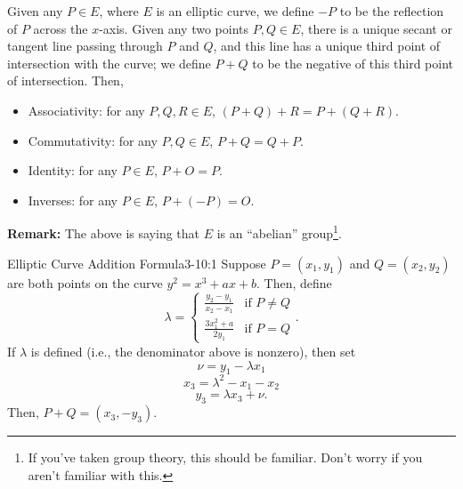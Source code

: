 \documentclass[letterpaper]{article}
\begin{document}
\begin{itemize}
    \begin{theorem}{}{}
        Given any $P \in E$, where $E$ is an elliptic curve, we define $-P$ to be the reflection of $P$ across the $x$-axis. Given any two points $P, Q \in E$, there is a unique secant or tangent line passing through $P$ and $Q$, and this line has a unique third point of intersection with the curve; we define $P + Q$ to be the negative of this third point of intersection. Then, 
        \begin{itemize}
            \item Associativity: for any $P, Q, R \in E$, $(P + Q) + R = P + (Q + R)$.
            \item Commutativity: for any $P, Q \in E$, $P + Q = Q + P.$
            \item Identity: for any $P \in E$, $P + O = P.$
            \item Inverses: for any $P \in E$, $P + (-P) = O.$
        \end{itemize}
    \end{theorem}
    \textbf{Remark:} The above is saying that $E$ is an ``abelian'' group\footnote{If you've taken group theory, this should be familiar. Don't worry if you aren't familiar with this.}.
\end{itemize} 

\begin{theorem}{Elliptic Curve Addition Formula}{3-10:1}
    Suppose $P = (x_1, y_1)$ and $Q = (x_2, y_2)$ are both points on the curve $y^2 = x^3 + ax + b$. Then, define 
    \[\lambda = \begin{cases}
        \frac{y_2 - y_1}{x_2 - x_1} & \text{if } P \neq Q \\ 
        \frac{3x_1^2 + a}{2y_1} & \text{if } P = Q 
    \end{cases}.\]
    If $\lambda$ is defined (i.e., the denominator above is nonzero), then set 
    \[\nu = y_1 - \lambda x_1\]
    \[x_3 = \lambda^2 - x_1 - x_2\]
    \[y_3 = \lambda x_3 + \nu.\]
    Then, $P + Q = (x_3, -y_3)$. 
\end{theorem}
\end{document}
